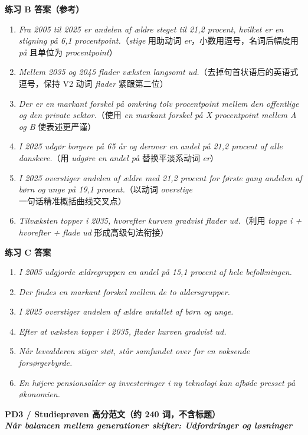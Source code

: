 \begin{answerbox}
\textbf{练习 B 答案（参考）}
\begin{enumerate}
  \item \textit{Fra 2005 til 2025 er andelen af ældre steget til 21,2 procent, hvilket er en stigning på 6,1 procentpoint.}（\textit{stige} 用助动词 \textit{er}，小数用逗号，名词后幅度用 \textit{på} 且单位为 \textit{procentpoint}）
  \item \textit{Mellem 2035 og 2045 flader væksten langsomt ud.}（去掉句首状语后的英语式逗号，保持 V2 动词 \textit{flader} 紧跟第二位）
  \item \textit{Der er en markant forskel på omkring tolv procentpoint mellem den offentlige og den private sektor.}（使用 \textit{en markant forskel på X procentpoint mellem A og B} 使表述更严谨）
  \item \textit{I 2025 udgør borgere på 65 år og derover en andel på 21,2 procent af alle danskere.}（用 \textit{udgøre en andel på} 替换平淡系动词 \textit{er}）
  \item \textit{I 2025 overstiger andelen af ældre med 21,2 procent for første gang andelen af børn og unge på 19,1 procent.}（以动词 \textit{overstige} 一句话精准概括曲线交叉点）
  \item \textit{Tilvæksten topper i 2035, hvorefter kurven gradvist flader ud.}（利用 \textit{toppe i + hvorefter + flade ud} 形成高级句法衔接）
\end{enumerate}

\textbf{练习 C 答案}
\begin{enumerate}
  \item \textit{I 2005 udgjorde ældregruppen en andel på 15,1 procent af hele befolkningen.}
  \item \textit{Der findes en markant forskel mellem de to aldersgrupper.}
  \item \textit{I 2025 overstiger andelen af ældre antallet af børn og unge.}
  \item \textit{Efter at væksten topper i 2035, flader kurven gradvist ud.}
  \item \textit{Når levealderen stiger støt, står samfundet over for en voksende forsørgerbyrde.}
  \item \textit{En højere pensionsalder og investeringer i ny teknologi kan afbøde presset på økonomien.}
\end{enumerate}

\textbf{PD3 / Studieprøven 高分范文（约 240 词，不含标题）}\\
\textit{\textbf{Når balancen mellem generationer skifter: Udfordringer og løsninger}}


\end{answerbox}
